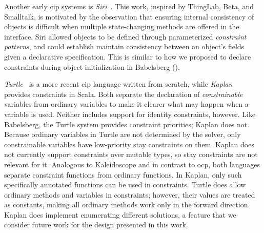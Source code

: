 Another early \ac{cip} systems is \emph{Siri}~\cite{horn-oopsla-1992}. This work,
inspired by ThingLab, Beta, and Smalltalk, is motivated by the observation that
ensuring internal consistency of objects is difficult when multiple
state-changing methods are offered in the interface. Siri allowed objects to be
defined through parameterized \emph{constraint patterns}, and could establish
maintain consistency between an object's fields given a declarative
specification. This is similar to how we proposed to declare constraints during
object initialization in Babelsberg ().

\emph{Turtle}~\cite{grabmuller2004turtle} is a more recent \ac{cip} language written
from scratch, while \emph{Kaplan}~\cite{koksal2012constraints} provides constraints in
Scala. Both separate the declaration of \mbox{\emph{constrainable}} variables
from ordinary variables to make it clearer what may happen when a variable is
used.  Neither includes support for identity constraints, however.  Like
Babelsberg, the Turtle system provides constraint priorities; Kaplan does
not. Because ordinary variables in Turtle are not determined by the solver, only
constrainable variables have low-priority stay constraints on them. Kaplan does
not currently support constraints over mutable types, so stay constraints are
not relevant for it.  Analogous to Kaleidoscope and in contrast to \ac{ocp},
both languages separate constraint functions from ordinary functions. In Kaplan,
only such specifically annotated functions can be used in constraints. Turtle
does allow ordinary methods and variables in constraints; however, their values
are treated as constants, making all ordinary methods work only in the forward
direction. Kaplan does implement enumerating different solutions, a feature that
we consider future work for the design presented in this work.


